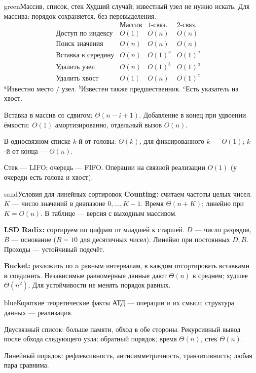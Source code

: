 \documentclass[a4paper,10pt]{article}
\newcommand{\key}[1]{\textbf{#1}}
\newlength{\colmax}
\newcounter{cheatcolnum}
\newenvironment{sheetcol}[1][.486\textwidth]{%
 \begin{lrbox}{\cheatcol}\begin{minipage}[t]{#1}\vspace{0pt}
}{%
 \end{minipage}\end{lrbox}\stepcounter{cheatcolnum}%
 \typeout{CHEAT-COLUMN-\thecheatcolnum: \the\dimexpr\ht\cheatcol+\dp\cheatcol\relax; LIMIT \the\colmax}%
 \ifdim\dimexpr\ht\cheatcol+\dp\cheatcol\relax>\colmax
 \PackageError{cheat}{Column \thecheatcolnum\space exceeds planned height}{Shorten content; keep body text at least 10pt.}\fi
 \usebox{\cheatcol}}
\begin{document}
\begin{sheetcol}[.512\textwidth]
\begin{card}{green}{Массив, список, стек\smash{\textsuperscript{*}}}
Худший случай; известный узел не нужно искать.
Для массива: порядок сохраняется, без перевыделения.
\[
\begin{array}{l|ccc}
 & \text{Массив} & \text{1-связ.} & \text{2-связ.}\\ \hline
\text{Доступ по индексу} & O(1)&O(n)&O(n)\\
\text{Поиск значения} & O(n)&O(n)&O(n)\\
\text{Вставка в середину} & O(n)&O(1)^a&O(1)^a\\
\text{Удалить узел} & O(n)&O(1)^b&O(1)^a\\
\text{Удалить хвост} & O(1)&O(n)&O(1)^c
\end{array}
\]
$^a$Известно место / узел. $^b$Известен также предшественник.
$^c$Есть указатель на хвост.

Вставка в массив со сдвигом: $\Theta(n-i+1)$.
Добавление в конец при удвоении ёмкости:
$O(1)$ амортизированно, отдельный вызов $O(n)$.

В односвязном списке $k$-й от головы:
$\Theta(k)$, для фиксированного $k$ --- $\Theta(1)$;
$k$-й от конца --- $\Theta(n)$.

Стек --- LIFO; очередь --- FIFO. Операции на связной
реализации $O(1)$ (у очереди есть голова и хвост).
\end{card}

\begin{card}{sand}{Условия для линейных сортировок}
\key{Counting:} считаем частоты целых чисел.
$K$ --- число значений в диапазоне $0,\ldots,K-1$.
Время $\Theta(n+K)$; линейно при $K=O(n)$.
В таблице --- версия с выходным массивом.

\key{LSD Radix:} сортируем по цифрам от младшей
к старшей. $D$ --- число разрядов, $B$ --- основание
($B=10$ для десятичных чисел).
Линейно при постоянных $D,B$.
Проходы --- устойчивый подсчёт.

\key{Bucket:} разложить по $n$ равным интервалам,
в каждом отсортировать вставками и соединить.
Независимые равномерные данные дают $\Theta(n)$
в среднем; худшее $\Theta(n^2)$.
Для устойчивости не менять порядок равных.
\end{card}

\begin{card}{blue}{Короткие теоретические факты}
АТД --- операции и их смысл; структура данных --- реализация.

Двусвязный список: больше памяти, обход в обе стороны.
Рекурсивный вывод после обхода следующего узла:
обратный порядок; время $\Theta(n)$, стек $\Theta(n)$.

Линейный порядок: рефлексивность, антисимметричность,
транзитивность; любая пара сравнима.
\end{card}
\end{sheetcol}
\endgroup
\setlength{\colmax}{\dimexpr\textheight-43pt\relax}
\newpage
\end{document}
